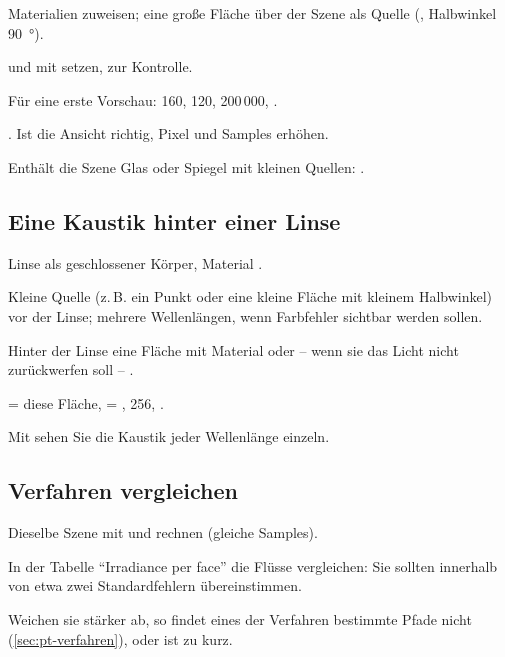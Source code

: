 \begin{schritte}
  \item Materialien zuweisen; eine große Fläche über der Szene als Quelle (, Halbwinkel
    \SI{90}{\degree}).
  \item {} und  mit  setzen,  zur Kontrolle.
  \item Für eine erste Vorschau:  160,  120,  200\,000,
     .
  \item {}. Ist die Ansicht richtig, Pixel und Samples erhöhen.
  \item Enthält die Szene Glas oder Spiegel mit kleinen Quellen: .
\end{schritte}

\subsection{Eine Kaustik hinter einer Linse}

\begin{schritte}
  \item Linse als geschlossener Körper, Material .
  \item Kleine Quelle (z.\,B. ein Punkt oder eine kleine Fläche mit kleinem Halbwinkel) vor der
    Linse; mehrere Wellenlängen, wenn Farbfehler sichtbar werden sollen.
  \item Hinter der Linse eine Fläche mit Material  oder -- wenn sie das Licht nicht
    zurückwerfen soll -- .
  \item {} = diese Fläche,  = , 
    256, .
  \item Mit  sehen Sie die Kaustik jeder Wellenlänge einzeln.
\end{schritte}

\subsection{Verfahren vergleichen}

\begin{schritte}
  \item Dieselbe Szene mit  und  rechnen (gleiche Samples).
  \item In der Tabelle \enquote{Irradiance per face} die Flüsse vergleichen: Sie sollten innerhalb
    von etwa zwei Standardfehlern übereinstimmen.
  \item Weichen sie stärker ab, so findet eines der Verfahren bestimmte Pfade nicht
    (\autoref{sec:pt-verfahren}), oder  ist zu kurz.
\end{schritte}


